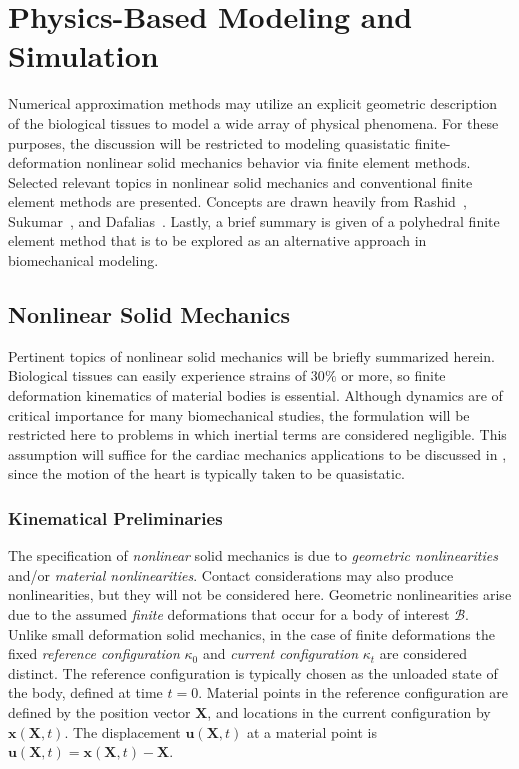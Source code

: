 \chapter{Physics-Based Modeling and Simulation}
\label{chap:4}
%

Numerical approximation methods may utilize an explicit geometric description of the biological tissues to model a wide array of physical phenomena. For these purposes, the discussion will be restricted to modeling quasistatic finite-deformation nonlinear solid mechanics behavior via finite element methods. Selected relevant topics in nonlinear solid mechanics and conventional finite element methods are presented. Concepts are drawn heavily from Rashid~\cite{rashid_2017, rashid_289, rashid_212, rashid_201}, Sukumar~\cite{suku_212}, and Dafalias~\cite{dafalias_205}. Lastly, a brief summary is given of a polyhedral finite element method that is to be explored as an alternative approach in biomechanical modeling.

\section{Nonlinear Solid Mechanics}
\label{Nonlinear Solid Mechanics}

Pertinent topics of nonlinear solid mechanics will be briefly summarized herein. Biological tissues can easily experience strains of 30$\%$ or more, so finite deformation kinematics of material bodies is essential. Although dynamics are of critical importance for many biomechanical studies, the formulation will be restricted here to problems in which inertial terms are considered negligible. This assumption will suffice for the cardiac mechanics applications to be discussed in , since the motion of the heart is typically taken to be quasistatic.

\subsection{Kinematical Preliminaries}

The specification of \textit{nonlinear} solid mechanics is due to \textit{geometric nonlinearities} and/or \textit{material nonlinearities}. Contact considerations may also produce nonlinearities, but they will not be considered here. Geometric nonlinearities arise due to the assumed \textit{finite} deformations that occur for a body of interest $\mathcal{B}$. Unlike small deformation solid mechanics, in the case of finite deformations the fixed \textit{reference configuration} $\kappa_0$ and \textit{current configuration} $\kappa_t$ are considered distinct. The reference configuration is typically chosen as the unloaded state of the body, defined at time $t=0$. Material points in the reference configuration are defined by the position vector $\bm{X}$, and locations in the current configuration by $\bm{x}(\bm{X},t)$. The displacement $\bm{u}(\bm{X},t)$ at a material point is $\bm{u}(\bm{X},t) = \bm{x}(\bm{X},t) - \bm{X}$.

